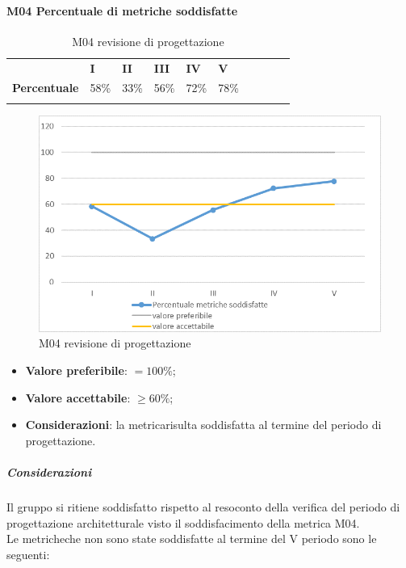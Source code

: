 \paragraph{M04 Percentuale di metriche soddisfatte} \mbox{}
\begin{longtable}[H!] {						
		>{}p{50mm}  		
		>{}p{8mm}
		>{}p{8mm}		
		>{}p{8mm}		
		>{}p{8mm}		
		>{}p{8mm}		
		>{}p{8mm}
		>{}p{8mm}
		>{}p{8mm}
		>{}p{8mm}
	}
	\rowcolor{gray!50}
	\textbf{} & \textbf{I} & \textbf{II} & \textbf{III} & \textbf{IV} & \textbf{V} \TBstrut \\ [2mm]
	\textbf{Percentuale} & 58\% & 33\% & 56\% & 72\% & 78\% \TBstrut \\ [2mm]
	\rowcolor{white}
	\caption{M04 revisione di progettazione\glo}
\end{longtable}
\begin{figure}[H] 	
\includegraphics[width=\linewidth]{./img/grafici/RP19.png}	
\caption{M04 revisione di progettazione\glo}	
\end{figure}
\begin{itemize}
	\item \textbf{Valore preferibile}: $=100\%$;
	\item \textbf{Valore accettabile}: $\ge60\%$;
	\item \textbf{Considerazioni}: la metrica\glosp risulta soddisfatta al termine del periodo di progettazione\glo.
\end{itemize}
\subparagraph{Considerazioni}
Il gruppo si ritiene soddisfatto rispetto al resoconto della verifica del periodo di progettazione architetturale visto il soddisfacimento della metrica M04. \\
Le metriche\glosp che non sono state soddisfatte al termine del V periodo sono le seguenti:
